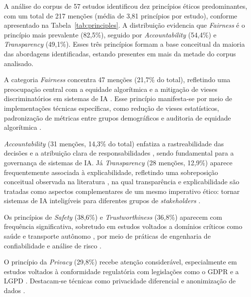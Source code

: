 A análise do corpus de 57 estudos identificou dez princípios éticos predominantes, com um total de 217 menções (média de 3,81 princípios por estudo), conforme apresentado na Tabela~\ref{tab:principles}. A distribuição evidencia que \textit{Fairness} é o princípio mais prevalente (82,5\%), seguido por \textit{Accountability} (54,4\%) e \textit{Transparency} (49,1\%). Esses três princípios formam a base conceitual da maioria das abordagens identificadas, estando presentes em mais da metade do corpus analisado.

A categoria \textit{Fairness} concentra 47 menções (21,7\% do total), refletindo uma preocupação central com a equidade algorítmica e a mitigação de vieses discriminatórios em sistemas de \acrshort{IA} \cite{Mehrabi2021, Chouldechova2017}. Esse princípio manifesta-se por meio de implementações técnicas específicas, como redução de vieses estatísticos, padronização de métricas entre grupos demográficos \cite{Barocas2019, CorbettDavies2018} e auditoria de equidade algorítmica \cite{Raji2020, buolamwini2018gender}.

\textit{Accountability} (31 menções, 14,3\% do total) enfatiza a rastreabilidade das decisões e a atribuição clara de responsabilidades \cite{Diakopoulos2016, Wieringa2020, Binns2018}, sendo fundamental para a governança de sistemas de IA. Já \textit{Transparency} (28 menções, 12,9\%) aparece frequentemente associada à explicabilidade, refletindo uma sobreposição conceitual observada na literatura \cite{Guidotti2018, BarredoArrieta2020}, na qual transparência e explicabilidade são tratadas como aspectos complementares de um mesmo imperativo ético: tornar sistemas de \acrshort{IA} inteligíveis para diferentes grupos de \textit{stakeholders} \cite{doshivelez2017, miller2018}.

Os princípios de \textit{Safety} (38,6\%) e \textit{Trustworthiness} (36,8\%) aparecem com frequência significativa, sobretudo em estudos voltados a domínios críticos como saúde \cite{Topol2019, Char2020} e transporte autônomo \cite{Borg2019, Koopman2016}, por meio de práticas de engenharia de confiabilidade \cite{Amodei2016, Huang2020} e análise de risco \cite{Uesato2018}.

O princípio da \textit{Privacy} (29,8\%) recebe atenção considerável, especialmente em estudos voltados à conformidade regulatória com legislações como o GDPR \cite{GDPR2016} e a LGPD \cite{LGPD2018}. Destacam-se técnicas como privacidade diferencial \cite{Abadi2016, Dwork2014} e anonimização de dados \cite{El-Emam2013, Fung2010}.

